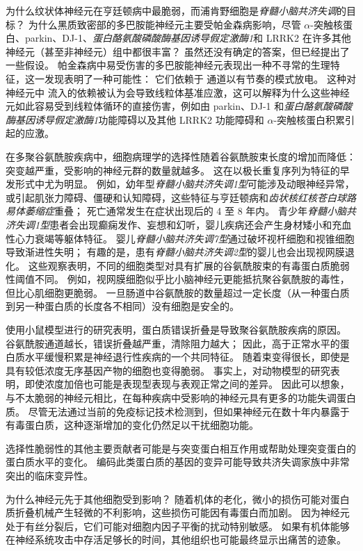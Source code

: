 为什么纹状体神经元在亨廷顿病中最脆弱，而浦肯野细胞是\textit{脊髓小脑共济失调}的目标？
为什么黑质致密部的多巴胺能神经元主要受帕金森病影响，尽管 $\alpha$-突触核蛋白、parkin、DJ-1、\textit{蛋白酪氨酸磷酸酶基因诱导假定激酶1}和 LRRK2 在许多其他神经元（甚至非神经元）组中都很丰富？
虽然还没有确定的答案，但已经提出了一些假设。
帕金森病中易受伤害的多巴胺能神经元表现出一种不寻常的生理特征，这一发现表明了一种可能性：
它们依赖于  通道以有节奏的模式放电。
这种对神经元中  流入的依赖被认为会导致线粒体基准应激，这可以解释为什么这些神经元如此容易受到线粒体循环的直接伤害，例如由 parkin、DJ-1 和\textit{蛋白酪氨酸磷酸酶基因诱导假定激酶1}功能障碍以及其他 LRRK2 功能障碍和 $\alpha$-突触核蛋白积累引起的应激。


在多聚谷氨酰胺疾病中，细胞病理学的选择性随着谷氨酰胺束长度的增加而降低：
突变越严重，受影响的神经元群的数量就越多。
这在以极长重复序列为特征的早发形式中尤为明显。
例如，幼年型\textit{脊髓小脑共济失调1型}可能涉及动眼神经异常，或引起肌张力障碍、僵硬和认知障碍，这些特征与亨廷顿病和\textit{齿状核红核苍白球路易体萎缩症}重叠；
死亡通常发生在症状出现后的 4 至 8 年内。
青少年\textit{脊髓小脑共济失调1型}患者会出现癫痫发作、妄想和幻听，婴儿疾病还会产生身材矮小和充血性心力衰竭等躯体特征。
婴儿\textit{脊髓小脑共济失调7型}通过破坏视杆细胞和视锥细胞导致渐进性失明；
有趣的是，患有\textit{脊髓小脑共济失调2型}的婴儿也会出现视网膜退化。
这些观察表明，不同的细胞类型对具有扩展的谷氨酰胺束的有毒蛋白质脆弱性阈值不同。
例如，视网膜细胞似乎比小脑神经元更能抵抗聚谷氨酰胺的毒性，但比心肌细胞更脆弱。
一旦肠道中谷氨酰胺的数量超过一定长度（从一种蛋白质到另一种蛋白质的长度各不相同）没有细胞是安全的。


使用小鼠模型进行的研究表明，蛋白质错误折叠是导致聚谷氨酰胺疾病的原因。
谷氨酰胺通道越长，错误折叠越严重，清除阻力越大；
因此，高于正常水平的蛋白质水平缓慢积累是神经退行性疾病的一个共同特征。
随着束变得很长，即使是具有较低浓度无序基因产物的细胞也变得脆弱。
事实上，对动物模型的研究表明，即使浓度加倍也可能是表现型表现与表观正常之间的差异。
因此可以想象，与不太脆弱的神经元相比，在每种疾病中受影响的神经元具有更多的功能失调蛋白质。
尽管无法通过当前的免疫标记技术检测到，但如果神经元在数十年内暴露于有毒蛋白质，这种逐渐增加的变化仍然足以干扰细胞功能。


选择性脆弱性的其他主要贡献者可能是与突变蛋白相互作用或帮助处理突变蛋白的蛋白质水平的变化。
编码此类蛋白质的基因的变异可能导致共济失调家族中非常突出的临床变异性。


为什么神经元先于其他细胞受到影响？
随着机体的老化，微小的损伤可能对蛋白质折叠机械产生轻微的不利影响，这些损伤可能因有毒蛋白而加剧。
因为神经元处于有丝分裂后，它们可能对细胞内因子平衡的扰动特别敏感。
如果有机体能够在神经系统攻击中存活足够长的时间，其他组织也可能最终显示出痛苦的迹象。



